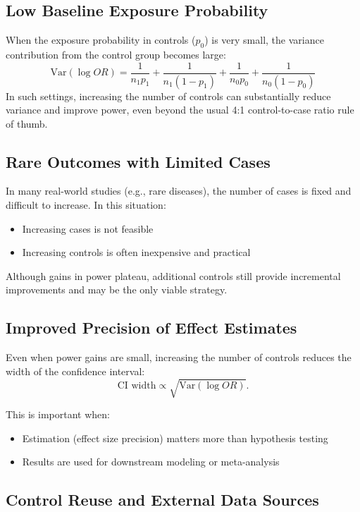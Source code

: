 \documentclass[11pt]{article}
\begin{document}
\subsection{Low Baseline Exposure Probability}

When the exposure probability in controls ($p_0$) is very small, the variance contribution from the control group becomes large:
\[
\mathrm{Var}(\log OR) 
= \frac{1}{n_1 p_1} + \frac{1}{n_1 (1 - p_1)} 
+ \frac{1}{n_0 p_0} + \frac{1}{n_0 (1 - p_0)}
\]
In such settings, increasing the number of controls can substantially reduce variance and improve power, even beyond the usual 4:1 control-to-case ratio rule of thumb.

\subsection{Rare Outcomes with Limited Cases}

In many real-world studies (e.g., rare diseases), the number of cases is fixed and difficult to increase. In this situation:
\begin{itemize}
    \item Increasing cases is not feasible
    \item Increasing controls is often inexpensive and practical
\end{itemize}

Although gains in power plateau, additional controls still provide incremental improvements and may be the only viable strategy.

\subsection{Improved Precision of Effect Estimates}

Even when power gains are small, increasing the number of controls reduces the width of the confidence interval:
\[
\text{CI width} \propto \sqrt{\mathrm{Var}(\log OR)}.
\]

This is important when:
\begin{itemize}
    \item Estimation (effect size precision) matters more than hypothesis testing
    \item Results are used for downstream modeling or meta-analysis
\end{itemize}

\subsection{Control Reuse and External Data Sources}
\end{document}
